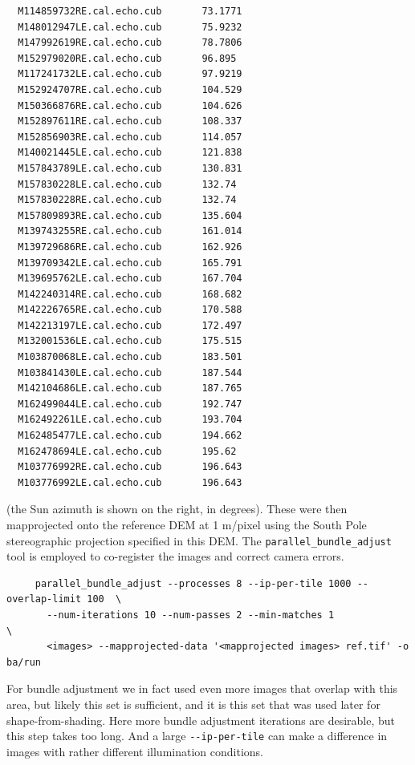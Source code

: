 \begin{verbatim}
  M114859732RE.cal.echo.cub       73.1771
  M148012947LE.cal.echo.cub       75.9232
  M147992619RE.cal.echo.cub       78.7806
  M152979020RE.cal.echo.cub       96.895
  M117241732LE.cal.echo.cub       97.9219
  M152924707RE.cal.echo.cub       104.529
  M150366876RE.cal.echo.cub       104.626
  M152897611RE.cal.echo.cub       108.337
  M152856903RE.cal.echo.cub       114.057
  M140021445LE.cal.echo.cub       121.838
  M157843789LE.cal.echo.cub       130.831
  M157830228LE.cal.echo.cub       132.74
  M157830228RE.cal.echo.cub       132.74
  M157809893RE.cal.echo.cub       135.604
  M139743255RE.cal.echo.cub       161.014
  M139729686RE.cal.echo.cub       162.926
  M139709342LE.cal.echo.cub       165.791
  M139695762LE.cal.echo.cub       167.704
  M142240314RE.cal.echo.cub       168.682
  M142226765RE.cal.echo.cub       170.588
  M142213197LE.cal.echo.cub       172.497
  M132001536LE.cal.echo.cub       175.515
  M103870068LE.cal.echo.cub       183.501
  M103841430LE.cal.echo.cub       187.544
  M142104686LE.cal.echo.cub       187.765
  M162499044LE.cal.echo.cub       192.747
  M162492261LE.cal.echo.cub       193.704
  M162485477LE.cal.echo.cub       194.662
  M162478694LE.cal.echo.cub       195.62
  M103776992RE.cal.echo.cub       196.643
  M103776992LE.cal.echo.cub       196.643
\end{verbatim}

(the Sun azimuth is shown on the right, in degrees). These were then mapprojected
onto the reference DEM at 1 m/pixel using the South Pole stereographic
projection specified in this DEM. The \texttt{parallel\_bundle\_adjust}
tool is employed to co-register the images and correct camera errors. 

\begin{verbatim}
     parallel_bundle_adjust --processes 8 --ip-per-tile 1000 --overlap-limit 100  \
       --num-iterations 10 --num-passes 2 --min-matches 1                         \
       <images> --mapprojected-data '<mapprojected images> ref.tif' -o ba/run
\end{verbatim}

For bundle adjustment we in fact used even more images that overlap
with this area, but likely this set is sufficient, and it is this set
that was used later for shape-from-shading. Here more bundle
adjustment iterations are desirable, but this step takes too long. And a large
\texttt{-\/-ip-per-tile} can make a difference in images with rather
different illumination conditions.

